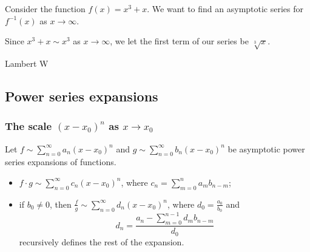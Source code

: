 \begin{example}
Consider the function $f(x) = x^3 + x$. We want to find an asymptotic series for $f^{-1}(x)$ as $x\to \infty$.

Since $x^3 + x \sim x^3$ as $x\to \infty$, we let the first term of our series be $\sqrt[3]{x}$.
\end{example}


\begin{example}
Lambert W
\end{example}


\subsection{Power series expansions}
\subsubsection{The scale $(x-x_0)^n$ as $x\to x_0$}
\begin{lemma}
Let $f \sim \sum_{n=0}^\infty a_n(x-x_0)^n$ and $g \sim \sum_{n=0}^\infty b_n(x-x_0)^n$ be asymptotic power series expansions of functions.
\begin{itemize}
\item $f\cdot g \sim \sum_{n=0}^\infty c_n(x-x_0)^n$, where $c_n = \sum_{m=0}^n a_mb_{n-m}$;
\item if $b_0 \neq 0$, then $\frac{f}{g} \sim \sum_{n=0}^\infty d_n(x-x_0)^n$, where $d_0 = \frac{a_0}{b_0}$ and
\[ d_n = \frac{a_n - \sum_{m=0}^{n-1}d_mb_{n-m}}{d_0} \]
recursively defines the rest of the expansion.
\end{itemize}
\end{lemma}

